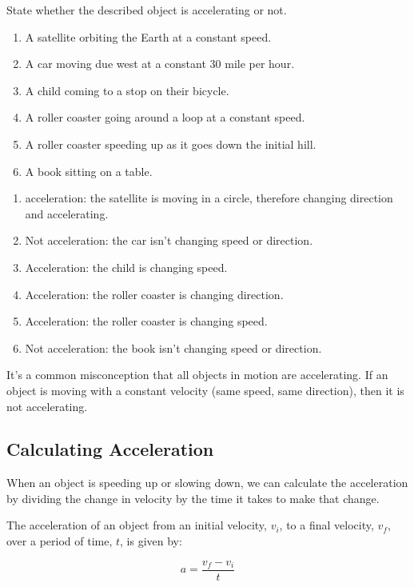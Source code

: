 \begin{Exercise}[title = {Is it accelerating?}, label = accel]
State whether the described object is accelerating or not. 
\begin{enumerate}
\item A satellite orbiting the Earth at a constant speed.
\item A car moving due west at a constant 30 mile per hour.
\item A child coming to a stop on their bicycle.
\item A roller coaster going around a loop at a constant speed.
\item A roller coaster speeding up as it goes down the initial hill.
\item A book sitting on a table. 
\end{enumerate}
\end{Exercise}

\begin{Answer}[ref = accel]
\begin{enumerate}
\item acceleration: the satellite is moving in a circle, therefore changing 
direction and accelerating.
\item Not acceleration: the car isn't changing speed or direction.
\item Acceleration: the child is changing speed.
\item Acceleration: the roller coaster is changing direction.
\item Acceleration: the roller coaster is changing speed. 
\item Not acceleration: the book isn't changing speed or direction.
\end{enumerate}
\end{Answer}

It's a common misconception that all objects in motion are accelerating. If an 
object is moving with a constant velocity (same speed, same direction), then it 
is not accelerating. 

\subsection{Calculating Acceleration}
When an object is speeding up or slowing down, we can calculate the acceleration 
by dividing the change in velocity by the time it takes to make that change. 

\begin{mdframed}[style = important, frametitle = {Calculating Acceleration}]
The acceleration of an object from an initial velocity, $v_i$, to a final
velocity, $v_f$, over a period of time, $t$, is given by:

$$a = \frac{v_f - v_i}{t}$$
\end{mdframed}

